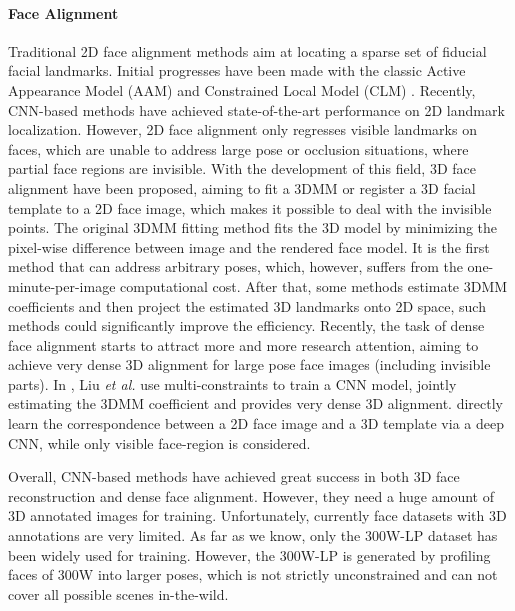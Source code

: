 \documentclass[10pt,twocolumn,letterpaper]{article}
\begin{document}
\paragraph{Face Alignment}
Traditional 2D face alignment methods aim at locating a sparse set of fiducial facial landmarks. Initial progresses have been made with the classic Active Appearance Model (AAM) \cite{cootes1998active, saragih2007nonlinear, tzimiropoulos2013optimization} and Constrained Local Model (CLM) \cite{asthana2013robust, cristinacce2006feature, saragih2011deformable}. Recently, CNN-based methods \cite{liang2015unconstrained,peng2016recurrent,bulat2017far} have achieved state-of-the-art performance on 2D landmark localization. However, 2D face alignment only regresses visible landmarks on faces, which are unable to address large pose or occlusion situations, where partial face regions are invisible. With the development of this field, 3D face alignment have been proposed, aiming to fit a 3DMM \cite{zhu2016face,mcdonagh2016joint,gou2016shape} or register a 3D facial template \cite{santa20163d,de20163d} to a 2D face image, which makes it possible to deal with the invisible points. The original 3DMM fitting method \cite{blanz2003face} fits the 3D model by minimizing the pixel-wise difference between image and the rendered face model. It is the first method that can address arbitrary poses, which, however, suffers from the one-minute-per-image computational cost. After that, some methods estimate 3DMM coefficients and then project the estimated 3D landmarks onto 2D space, such methods \cite{jourabloo2015pose,cao2014displaced,jeni2015dense,jourabloo2017pose,jourabloo2017pose} could significantly improve the efficiency. Recently, the task of dense face alignment starts to attract more and more research attention, aiming to achieve very dense 3D alignment for large pose face images (including invisible parts). In \cite{liu2017dense}, Liu \textit{et al.} use multi-constraints to train a CNN model, jointly estimating the 3DMM coefficient and provides very dense 3D alignment. \cite{alp2017densereg,yu2017learning} directly learn the correspondence between a 2D face image and a 3D template via a deep CNN, while only visible face-region is considered.

Overall, CNN-based methods have achieved great success in both 3D face reconstruction and dense face alignment. However, they need a huge amount of 3D annotated images for training. Unfortunately, currently face datasets with 3D annotations are very limited. As far as we know, only the 300W-LP \cite{zhu2016face} dataset has been widely used for training. However, the 300W-LP is generated by profiling faces of 300W \cite{sagonas2013300} into larger poses, which is not strictly unconstrained and can not cover all possible scenes in-the-wild.
\end{document}
